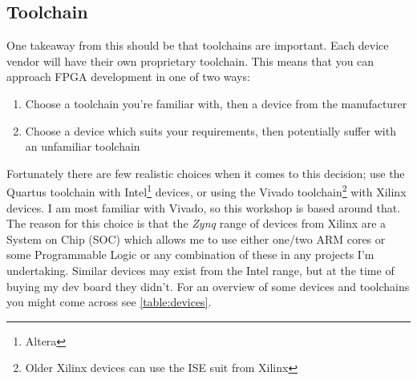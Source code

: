 \subsection{Toolchain}
One takeaway from this should be that toolchains are important. Each device vendor will have their own proprietary toolchain. This means that you can approach FPGA development in one of two ways:
\begin{enumerate}
    \item Choose a toolchain you're familiar with, then a device from the manufacturer
    \item Choose a device which suits your requirements, then potentially suffer with an unfamiliar toolchain
\end{enumerate}

Fortunately there are few realistic choices when it comes to this decision; use the Quartus toolchain with Intel\footnote{Altera} devices, or using the Vivado toolchain\footnote{Older Xilinx devices can use the ISE suit from Xilinx} with Xilinx devices. I am most familiar with Vivado, so this workshop is based around that. The reason for this choice is that the \emph{Zynq} range of devices from Xilinx are a System on Chip (SOC) which allows me to use either one/two ARM cores or some Programmable Logic or any combination of these in any projects I'm undertaking. Similar devices may exist from the Intel range, but at the time of buying my dev board they didn't. For an overview of some devices and toolchains you might come across see \cref{table:devices}.


